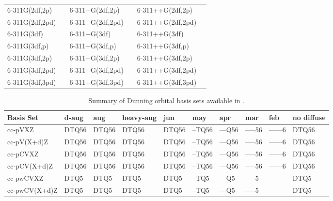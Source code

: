 \begin{table}[!htbp]
\begin{footnotesize}
\begin{center}
\begin{tabular}{llllll}
6-311G(2df,2p)  &            & 6-311+G(2df,2p)  &             & 6-311++G(2df,2p)  &              \\
6-311G(2df,2pd) &            & 6-311+G(2df,2pd) &             & 6-311++G(2df,2pd) &              \\
6-311G(3df)     &            & 6-311+G(3df)     &             & 6-311++G(3df)     &              \\
6-311G(3df,p)   &            & 6-311+G(3df,p)   &             & 6-311++G(3df,p)   &              \\
6-311G(3df,2p)  &            & 6-311+G(3df,2p)  &             & 6-311++G(3df,2p)  &              \\
6-311G(3df,2pd) &            & 6-311+G(3df,2pd) &             & 6-311++G(3df,2pd) &              \\
6-311G(3df,3pd) &            & 6-311+G(3df,3pd) &             & 6-311++G(3df,3pd) &              \\
\hline\hline
\end{tabular}
\end{center}
\end{footnotesize}
\end{table}


\begin{table}[!htbp]
\begin{footnotesize}
\caption{Summary of Dunning orbital basis sets available in \PSIfour.} \label{table:basisDunningOrbital}
\parsep 10pt
\begin{center}
\begin{tabular}{llllllllll} 
\hline\hline
Basis Set            & d-aug & aug & heavy-aug\cite{basisnote1} & jun & may & apr & mar & feb & no diffuse \\ 
\hline
cc-pVXZ              & DTQ56 & DTQ56 & DTQ56 & DTQ56 & --TQ56 & --{}--Q56 & --{}--{}--56 & --{}--{}--{}--6 & DTQ56 \\
cc-pV(X+d)Z          & DTQ56 & DTQ56 & DTQ56 & DTQ56 & --TQ56 & --{}--Q56 & --{}--{}--56 & --{}--{}--{}--6 & DTQ56 \\
cc-pCVXZ             & DTQ56 & DTQ56 & DTQ56 & DTQ56 & --TQ56 & --{}--Q56 & --{}--{}--56 & --{}--{}--{}--6 & DTQ56 \\
cc-pCV(X+d)Z         & DTQ56 & DTQ56 & DTQ56 & DTQ56 & --TQ56 & --{}--Q56 & --{}--{}--56 & --{}--{}--{}--6 & DTQ56 \\
cc-pwCVXZ            & DTQ5  & DTQ5  & DTQ5  & DTQ5  & --TQ5  & --{}--Q5  & --{}--{}--5  &                 & DTQ5  \\
cc-pwCV(X+d)Z        & DTQ5  & DTQ5  & DTQ5  & DTQ5  & --TQ5  & --{}--Q5  & --{}--{}--5  &                 & DTQ5  \\
\hline\hline
\end{tabular}
\end{center}
\end{footnotesize}
\end{table}


